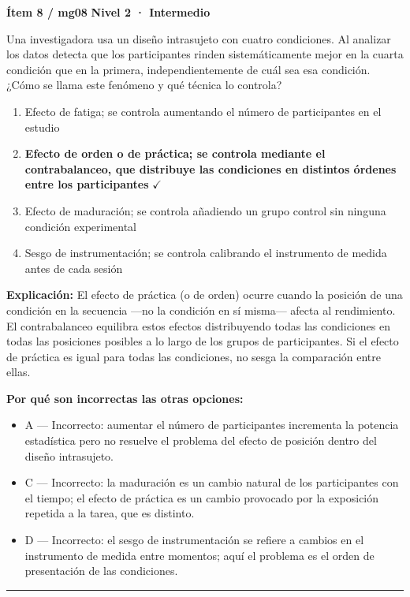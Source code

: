 \documentclass[12pt,a4paper]{article}
\begin{document}
\begin{mdframed}[backgroundcolor=fondogris,linecolor=ambar,linewidth=1pt,innerleftmargin=10pt,innerrightmargin=10pt,innertopmargin=7pt,innerbottommargin=7pt]
\textbf{Ítem 8 / mg08} \hfill {\small\bfseries\color{ambar} Nivel 2 · Intermedio}
\end{mdframed}

Una investigadora usa un diseño intrasujeto con cuatro condiciones. Al analizar los datos detecta que los participantes rinden sistemáticamente mejor en la cuarta condición que en la primera, independientemente de cuál sea esa condición. ¿Cómo se llama este fenómeno y qué técnica lo controla?

\begin{enumerate}
  \item[A.] Efecto de fatiga; se controla aumentando el número de participantes en el estudio
  \item[\textbf{\color{verde}B.}] \textbf{\color{verde} Efecto de orden o de práctica; se controla mediante el contrabalanceo, que distribuye las condiciones en distintos órdenes entre los participantes} \hfill $\checkmark$
  \item[C.] Efecto de maduración; se controla añadiendo un grupo control sin ninguna condición experimental
  \item[D.] Sesgo de instrumentación; se controla calibrando el instrumento de medida antes de cada sesión
\end{enumerate}

\noindent\textbf{\color{azul}Explicación:} El efecto de práctica (o de orden) ocurre cuando la posición de una condición en la secuencia —no la condición en sí misma— afecta al rendimiento. El contrabalanceo equilibra estos efectos distribuyendo todas las condiciones en todas las posiciones posibles a lo largo de los grupos de participantes. Si el efecto de práctica es igual para todas las condiciones, no sesga la comparación entre ellas.

\noindent\textbf{\color{gris}Por qué son incorrectas las otras opciones:}
\begin{itemize}
  \item {\small A — Incorrecto: aumentar el número de participantes incrementa la potencia estadística pero no resuelve el problema del efecto de posición dentro del diseño intrasujeto.}
  \item {\small C — Incorrecto: la maduración es un cambio natural de los participantes con el tiempo; el efecto de práctica es un cambio provocado por la exposición repetida a la tarea, que es distinto.}
  \item {\small D — Incorrecto: el sesgo de instrumentación se refiere a cambios en el instrumento de medida entre momentos; aquí el problema es el orden de presentación de las condiciones.}
\end{itemize}
\vspace{8pt}\hrule\vspace{10pt}
\end{document}
